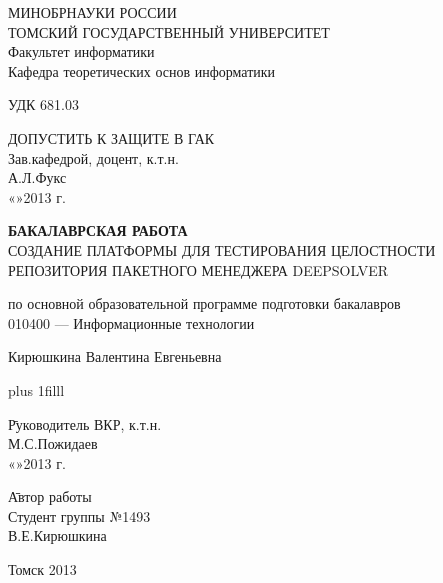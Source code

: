 \large
\thispagestyle{empty}
\begin{center}
МИНОБРНАУКИ РОССИИ\\
ТОМСКИЙ ГОСУДАРСТВЕННЫЙ УНИВЕРСИТЕТ\\
Факультет информатики\\
Кафедра теоретических основ информатики\\
\end{center}

УДК 681.03

\vspace{0.5cm}

\begin{flushright}
ДОПУСТИТЬ К ЗАЩИТЕ В ГАК\\
Зав.кафедрой, доцент, к.т.н.\\
\makebox[3cm]{\hrulefill}А.Л.Фукс\\
«\makebox[0.8cm]{\hrulefill}»\makebox[1.5cm]{\hrulefill}2013 г.\\
\end{flushright}



\begin{center}

\vspace{1.5cm}
{\bf БАКАЛАВРСКАЯ РАБОТА}\\
\vspace{0.5cm}
СОЗДАНИЕ ПЛАТФОРМЫ ДЛЯ ТЕСТИРОВАНИЯ ЦЕЛОСТНОСТИ РЕПОЗИТОРИЯ ПАКЕТНОГО МЕНЕДЖЕРА DEEPSOLVER

\vspace{0.5cm}
по основной образовательной программе подготовки бакалавров\\
010400 --- Информационные технологии

\vspace{0.5cm}

Кирюшкина Валентина Евгеньевна


\end{center}

\vskip 0pt plus 1filll

\begin{tabbing}
\hspace{10cm}\=Руководитель ВКР, к.т.н.\\
\>\makebox[3cm]{\hrulefill}М.С.Пожидаев\\
\>«\makebox[0.8cm]{\hrulefill}»\makebox[1.5cm]{\hrulefill}2013 г.\\
\end{tabbing}

\begin{tabbing}
\hspace{10cm}\=Автор работы\\
\>Студент группы №1493\\
\>\makebox[3cm]{\hrulefill}В.Е.Кирюшкина\\
\end{tabbing}

\vspace*{1cm}

\begin{center}
Томск 2013
\end{center}
\normalsize
